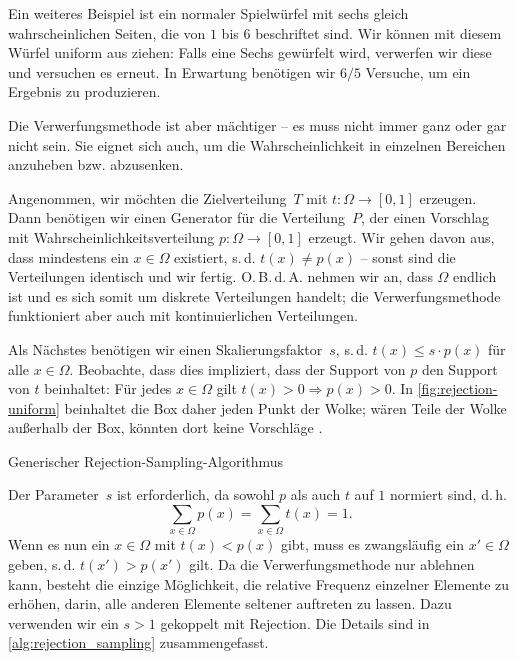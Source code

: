 Ein weiteres Beispiel ist ein normaler Spielwürfel mit sechs gleich wahrscheinlichen Seiten, die von $1$ bis $6$ beschriftet sind.
Wir können mit diesem Würfel uniform aus  ziehen:
Falls eine Sechs gewürfelt wird, verwerfen wir diese und versuchen es erneut.
In Erwartung benötigen wir $6/5$ Versuche, um ein Ergebnis zu produzieren.

Die Verwerfungsmethode ist aber mächtiger -- es muss nicht immer ganz oder gar nicht sein.
Sie eignet sich auch, um die Wahrscheinlichkeit in einzelnen Bereichen anzuheben bzw. abzusenken.

Angenommen, wir möchten die Zielverteilung~$T$ mit $t\colon \Omega \to [0, 1]$ erzeugen.
Dann benötigen wir einen Generator für die Verteilung~$P$, der einen Vorschlag mit Wahrscheinlichkeitsverteilung $p\colon \Omega \to [0, 1]$ erzeugt.
Wir gehen davon aus, dass mindestens ein $x \in \Omega$ existiert, s.\,d. $t(x) \ne p(x)$ -- sonst sind die Verteilungen identisch und wir fertig.
O.\,B.\,d.\,A. nehmen wir an, dass $\Omega$ endlich ist und es sich somit um diskrete Verteilungen handelt; die Verwerfungsmethode funktioniert aber auch mit kontinuierlichen Verteilungen.

Als Nächstes benötigen wir einen Skalierungsfaktor~$s$, s.\,d. $t(x) \le s \cdot p(x)$ für alle $x \in \Omega$.
Beobachte, dass dies impliziert, dass der Support von $p$ den Support von $t$ beinhaltet:
Für jedes $x\in \Omega$ gilt $t(x) > 0 \Rightarrow p(x) > 0$.
In \cref{fig:rejection-uniform} beinhaltet die Box daher jeden Punkt der Wolke; wären Teile der Wolke außerhalb der Box, könnten dort keine Vorschläge .

\begin{algorithm}[t]
    \caption{Generischer Rejection-Sampling-Algorithmus}
    \label{alg:rejection_sampling}
\end{algorithm}

Der Parameter~$s$ ist erforderlich, da sowohl $p$ als auch $t$ auf $1$ normiert sind, d.\,h.
\begin{equation}
    \sum_{x \in \Omega} p(x) = \sum_{x \in \Omega} t(x) = 1.
\end{equation}
Wenn es nun ein $x \in \Omega$ mit $t(x) < p(x)$ gibt, muss es zwangsläufig ein $x' \in \Omega$ geben, s.\,d. $t(x') > p(x')$ gilt.
Da die Verwerfungsmethode nur ablehnen kann, besteht die einzige Möglichkeit, die relative Frequenz einzelner Elemente zu erhöhen, darin, alle anderen Elemente seltener auftreten zu lassen.
Dazu verwenden wir ein $s > 1$ gekoppelt mit  Rejection.
Die Details sind in \cref{alg:rejection_sampling} zusammengefasst.

